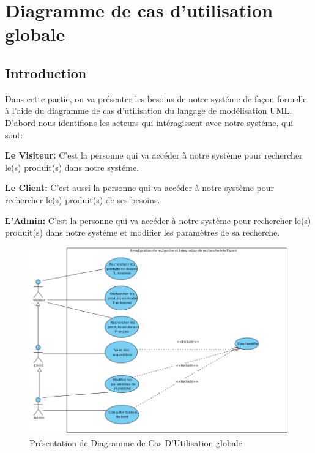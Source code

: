 \section{Diagramme de cas d’utilisation globale}
\subsection{Introduction}
\noindent
Dans cette partie, on va présenter les besoins de notre systéme de façon formelle à l'aide du diagramme de cas d'utilisation du langage de modélisation UML. D'abord nous identifions les acteurs qui intéragissent avec notre systéme, qui sont:

\noindent
\small\textbf{Le Visiteur: } C'est la personne qui va accéder à notre système pour rechercher le(s) produit(s) dans notre systéme.

\noindent
\small\textbf{Le Client: } C'est aussi la personne qui va accéder à notre système pour rechercher le(s) produit(s) de ses besoins. 

\noindent
\small\textbf{L'Admin: } C'est la personne qui va accéder à notre système pour rechercher le(s) produit(s) dans notre systéme et modifier les paramètres de sa recherche. 

\begin{figure}[H]
\centering
\includegraphics[width=1\textwidth]{logos/CU_global.png}
\caption{Présentation de Diagramme de Cas D'Utilisation globale}
\label{fig:diagcuglobal}
\end{figure}